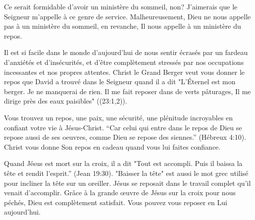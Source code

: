 
\begin{savenotes}%
\end{savenotes}

Ce serait formidable d'avoir un ministère du sommeil, non? J'aimerais que le Seigneur m'appelle à ce genre de service. Malheureusement, Dieu ne nous appelle pas à un ministère du sommeil, en revanche, Il nous appelle à un ministère du repos.

Il est si facile dans le monde d'aujourd'hui de nous sentir écrasés par un fardeau d'anxiétés et d'insécurités, et d'être complètement stressés par nos occupations incessantes et nos propres attentes. Christ le Grand Berger veut vous donner le repos que David a trouvé dans le Seigneur quand il a dit "L’Éternel est mon berger. Je ne manquerai de rien. Il me fait reposer dans de verts pâturages, Il me dirige près des eaux paisibles" ((23:1,2)).

Vous trouvez un repos, une paix, une sécurité, une plénitude incroyables en confiant votre vie à Jésus-Christ. “Car celui qui entre dans le repos de Dieu se repose aussi de ses oeuvres, comme Dieu se repose des siennes.” (Hébreux 4:10). Christ vous donne Son repos en cadeau quand vous lui faites confiance.

Quand Jésus est mort sur la croix, il a dit "Tout est accompli. Puis il baissa la tête et rendit l’esprit.” (Jean 19:30). "Baisser la tête" est aussi le mot grec utilisé pour incliner la tête sur un oreiller. Jésus se reposait dans le travail complet qu'il venait d'accomplir. Grâce à la grande œuvre de Jésus sur la croix pour nous péchés, Dieu est complètement satisfait. Vous pouvez vous reposer en Lui aujourd'hui.

